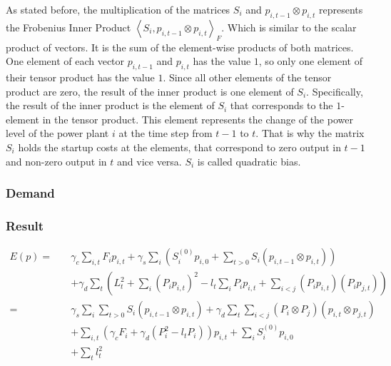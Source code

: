 As stated before, the multiplication of the matrices $S_i$ and $p_{i, t-1} \otimes p_{i, t}$ represents the Frobenius Inner Product $\left\langle S_i, p_{i, t-1} \otimes p_{i, t} \right\rangle_F$.
Which is similar to the scalar product of vectors.
It is the sum of the element-wise products of both matrices.
One element of each vector $p_{i, t-1}$ and $p_{i, t}$ has the value $1$, so only one element of their tensor product has the value $1$.
Since all other elements of the tensor product are zero, the result of the inner product is one element of $S_i$.
Specifically, the result of the inner product is the element of $S_i$ that corresponds to the $1$-element in the tensor product.
This element represents the change of the power level of the power plant $i$ at the time step from $t-1$ to $t$.
That is why the matrix $S_i$ holds the startup costs at the elements, that correspond to zero output in $t-1$ and non-zero output in $t$ and vice versa.
$S_i$ is called quadratic bias.

\subsubsection{Demand}


\subsubsection{Result}

\begin{subequations}
\begin{align}
  E(p) = \quad
  &
  \gamma_c \sum_{i, t} F_i p_{i, t}
  + \gamma_s \sum_i \left(
      S_i^{(0)} p_{i, 0}
      + \sum_{t > 0} S_i \left( p_{i, t-1} \otimes p_{i, t} \right)
    \right)
  \\ &
  + \gamma_d \sum_t \left(
    L_t^2
    + \sum_i \left( P_i p_{i, t} \right)^2 - l_t \sum_i P_i p_{i, t}
    + \sum_{i < j} \left( P_i p_{i, t} \right) \left( P_i p_{j, t} \right)
  \right) \\
  = \quad
  &
  \gamma_s \sum_i \sum_{t > 0} S_i \left( p_{i, t-1} \otimes p_{i, t} \right)
  + \gamma_d \sum_t \sum_{i < j} \left( P_i \otimes P_j \right) \left( p_{i, t} \otimes p_{j, t} \right)
  \\ &
  + \sum_{i, t} \left(
    \gamma_c F_i + \gamma_d \left(P_i^2 - l_t P_i \right)
  \right) p_{i, t}
  + \sum_i S_i^{(0)} p_{i, 0}
  \\ &
  + \sum_t l_t^2
\end{align}
\end{subequations}
